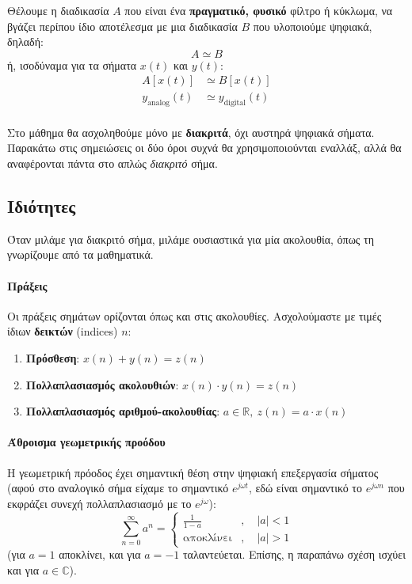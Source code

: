 \documentclass[11pt,a4paper,notitlepage,fleqn]{article}
\begin{document}
Θέλουμε η διαδικασία \( A \) που είναι ένα \textbf{πραγματικό, φυσικό} φίλτρο ή κύκλωμα, να βγάζει
περίπου ίδιο αποτέλεσμα με μια διαδικασία \( B \) που υλοποιούμε ψηφιακά, δηλαδή:
\[
A \simeq B
\]
ή, ισοδύναμα για τα σήματα \( x(t) \) και \( y(t) \):
\begin{align*}
	A\left[x(t)\right] &\simeq B\left[x(t)\right] \\
	y_{\mathrm{analog}}(t) &\simeq y_{\mathrm{digital}}(t)
\end{align*}

\paragraph{}
Στο μάθημα θα ασχοληθούμε μόνο με \textbf{διακριτά}, όχι αυστηρά ψηφιακά σήματα. Παρακάτω στις σημειώσεις οι δύο όροι
συχνά θα χρησιμοποιούνται εναλλάξ, αλλά θα αναφέρονται πάντα στο απλώς \emph{διακριτό} σήμα.

\subsection{Ιδιότητες}
Όταν μιλάμε για διακριτό σήμα, μιλάμε ουσιαστικά για μία ακολουθία, όπως τη γνωρίζουμε από τα μαθηματικά.

\paragraph{Πράξεις}
Οι πράξεις σημάτων ορίζονται όπως και στις ακολουθίες. Ασχολούμαστε με τιμές ίδιων \textbf{δεικτών} (indices) \( n \):
\begin{enumerate}
	\item \textbf{Πρόσθεση}: \( x(n) + y(n) = z(n) \)
	\item \textbf{Πολλαπλασιασμός ακολουθιών}: \( x(n) \cdot y(n) = z(n) \)
	\item \textbf{Πολλαπλασιασμός αριθμού-ακολουθίας}: \( a\in\mathbb R,\ z(n) = a\cdot x(n) \)
\end{enumerate}

\paragraph{Άθροισμα γεωμετρικής προόδου}
Η γεωμετρική πρόοδος έχει σημαντική θέση στην ψηφιακή επεξεργασία σήματος (αφού στο αναλογικό σήμα
είχαμε το σημαντικό \( e^{j\omega t} \), εδώ είναι σημαντικό το \( e^{j\omega n} \) που εκφράζει συνεχή πολλαπλασιασμό με το \( e^{j\omega } \)):
\[
\sum_{n=0}^{\infty} a^n
= \begin{cases}
\displaystyle \frac{1}{1-a} &,\quad |a|<1\\
\text{αποκλίνει}&,\quad |a|>1
\end{cases}
\]
(για \( a=1 \) αποκλίνει, και για \( a=-1 \) ταλαντεύεται. Επίσης, η παραπάνω σχέση ισχύει και για
\( a\in\mathbb C \)).
\end{document}
